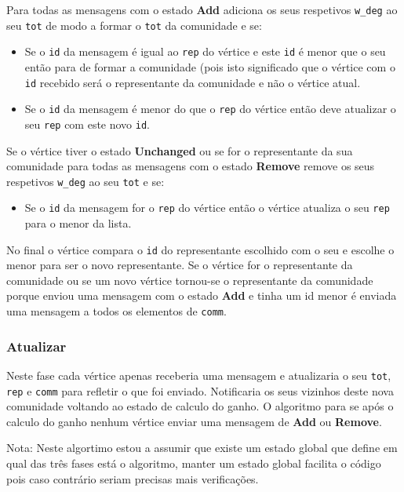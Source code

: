 \documentclass[a4paper,10pt]{report}
\begin{document}
Para todas as mensagens com o estado \textbf{Add} adiciona os seus respetivos \verb|w_deg| ao seu \verb|tot| de modo a formar o \verb|tot| da comunidade e se:
\begin{itemize}
	\item Se o \verb|id| da mensagem é igual ao \verb|rep| do vértice e este \verb|id| é menor que o seu então para de formar a comunidade (pois isto significado que o vértice com o \verb|id| recebido será o representante da comunidade e não o vértice atual.
	\item Se o \verb|id| da mensagem é menor do que o \verb|rep| do vértice então deve atualizar o seu \verb|rep| com este novo \verb|id|.
\end{itemize}
Se o vértice tiver o estado \textbf{Unchanged} ou se for o representante da sua comunidade para todas as mensagens com o estado \textbf{Remove} remove os seus respetivos \verb|w_deg| ao seu \verb|tot| e se:
\begin{itemize}
	\item Se o \verb|id| da mensagem for o \verb|rep| do vértice então o vértice atualiza o seu \verb|rep| para o menor da lista.
\end{itemize}
No final o vértice compara o \verb|id| do representante escolhido com o seu e escolhe o menor para ser o novo representante. Se o vértice for o representante da comunidade ou se um novo vértice tornou-se o representante da comunidade porque enviou uma mensagem com o estado \textbf{Add} e tinha um id menor é enviada uma mensagem a todos os elementos de \verb|comm|.

\subsubsection*{Atualizar}
Neste fase cada vértice apenas receberia uma mensagem e atualizaria o seu \verb|tot|, \verb|rep| e \verb|comm| para refletir o que foi enviado. Notificaria os seus vizinhos deste nova comunidade voltando ao estado de calculo do ganho. O algoritmo para se após o calculo do ganho nenhum vértice enviar uma mensagem de \textbf{Add} ou \textbf{Remove}.


Nota: Neste algortimo estou a assumir que existe um estado global que define em qual das três fases está o algoritmo, manter um estado global facilita o código pois caso contrário seriam precisas mais verificações.
%
%
%
%
\end{document}
